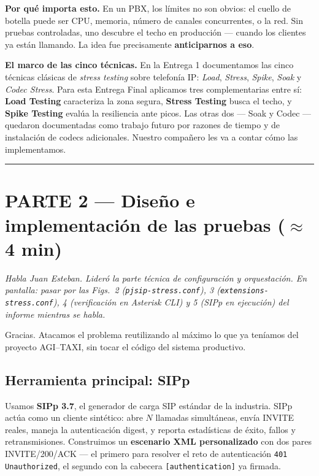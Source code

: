 \documentclass[11pt]{article}
\newcommand{\cue}[1]{%
  \begin{tcolorbox}[colback=blockbg,colframe=blockbg,boxrule=0pt,arc=2pt,left=8pt,right=8pt,top=4pt,bottom=4pt]
    \footnotesize\itshape\color{muted}#1
  \end{tcolorbox}%
}
\begin{document}
\medskip
\textbf{Por qu\'e importa esto.} En un PBX, los l\'imites no son obvios: el cuello de botella puede ser CPU, memoria, n\'umero de canales concurrentes, o la red. Sin pruebas controladas, uno descubre el techo en producci\'on --- cuando los clientes ya est\'an llamando. La idea fue precisamente \textbf{anticiparnos a eso}.

\medskip
\textbf{El marco de las cinco t\'ecnicas.} En la Entrega 1 documentamos las cinco t\'ecnicas cl\'asicas de \textit{stress testing} sobre telefon\'ia IP: \textit{Load}, \textit{Stress}, \textit{Spike}, \textit{Soak} y \textit{Codec Stress}. Para esta Entrega Final aplicamos tres complementarias entre s\'i: \textbf{Load Testing} caracteriza la zona segura, \textbf{Stress Testing} busca el techo, y \textbf{Spike Testing} eval\'ua la resiliencia ante picos. Las otras dos --- Soak y Codec --- quedaron documentadas como trabajo futuro por razones de tiempo y de instalaci\'on de codecs adicionales. Nuestro compa\~nero les va a contar c\'omo las implementamos.

\vspace{6pt}\hrule\vspace{10pt}

\section*{PARTE 2 --- Dise\~no e implementaci\'on de las pruebas ($\approx$ 4 min)}

\cue{Habla Juan Esteban. Lider\'o la parte t\'ecnica de configuraci\'on y orquestaci\'on. En pantalla: pasar por las Figs.~2 (\texttt{pjsip-stress.conf}), 3 (\texttt{extensions-stress.conf}), 4 (verificaci\'on en Asterisk CLI) y 5 (SIPp en ejecuci\'on) del informe mientras se habla.}

\noindent Gracias. Atacamos el problema reutilizando al m\'aximo lo que ya ten\'iamos del proyecto AGI--TAXI, sin tocar el c\'odigo del sistema productivo.

\subsection*{Herramienta principal: SIPp}
Usamos \textbf{SIPp 3.7}, el generador de carga SIP est\'andar de la industria. SIPp act\'ua como un cliente sint\'etico: abre $N$ llamadas simult\'aneas, env\'ia INVITE reales, maneja la autenticaci\'on digest, y reporta estad\'isticas de \'exito, fallos y retransmisiones. Construimos un \textbf{escenario XML personalizado} con dos pares INVITE/200/ACK --- el primero para resolver el reto de autenticaci\'on \texttt{401 Unauthorized}, el segundo con la cabecera \texttt{[authentication]} ya firmada.
\end{document}
